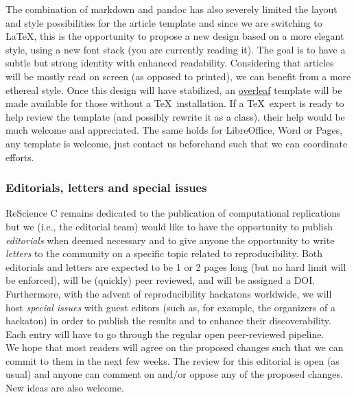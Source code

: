 The combination of markdown and pandoc has also severely limited the layout and
style possibilities for the article template and since we are switching to
\LaTeX, this is the opportunity to propose a new design based on a more elegant
style, using a new font stack\supercite{SourceSerifPro:2014, Roboto:2011,
  SourceCodePro:2012} (you are currently reading it). The goal is to have a
subtle but strong identity with enhanced readability. Considering that articles
will be mostly read on screen (as opposed to printed), we can benefit from a
more ethereal style. Once this design will have stabilized, an
\href{https://www.overleaf.com/}{overleaf} template will be made available for
those without a \TeX~installation. If a \TeX~expert is ready to help review
the template (and possibly rewrite it as a class), their help would be much
welcome and appreciated. The same holds for LibreOffice, Word or Pages, any
template is welcome, just contact us beforehand such that we can coordinate
efforts.


\subsubsection{Editorials, letters and special issues}

ReScience C remains dedicated to the publication of computational replications
but we (i.e., the editorial team) would like to have the opportunity to
publish \emph{editorials} when deemed necessary and to give anyone the
opportunity to write \emph{letters} to the community on a specific topic
related to reproducibility. Both editorials and letters are expected to be 1 or
2 pages long (but no hard limit will be enforced), will be (quickly) peer reviewed,
and will be assigned a DOI. Furthermore, with the advent of reproducibility
hackatons worldwide, we will host {\em special issues} with guest editors (such
as, for example, the organizers of a hackaton) in order to publish the results
and to enhance their discoverability. Each entry will have to go through the
regular open peer-reviewed pipeline.\\


We hope that most readers will agree on the proposed changes such that we can
commit to them in the next few weeks. The review for this editorial is open (as
usual) and anyone can comment on and/or oppose any of the proposed changes. New
ideas are also welcome.

